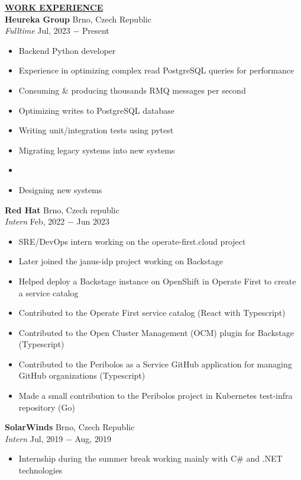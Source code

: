 \documentclass[11pt]{article}
\begin{document}
\noindent \textbf{\underline{WORK EXPERIENCE}} \\
\noindent \textbf{Heureka Group} \hfill Brno, Czech Republic \\
\textit{Fulltime} \hfill Jul, 2023 $-$ Present
\begin{itemize}[noitemsep,nolistsep,leftmargin=*]
\item Backend Python developer
\item Experience in optimizing complex read PostgreSQL queries for performance
\item Consuming \& producing thousands RMQ messages per second
\item Optimizing writes to PostgreSQL database
\item Writing unit/integration tests using pytest
\item Migrating legacy systems into new systems
\item 
\item Designing new systems \\
\end{itemize}

\noindent \textbf{Red Hat} \hfill Brno, Czech republic \\
\textit{Intern} \hfill Feb, 2022 $-$ Jun 2023
\begin{itemize}[noitemsep,nolistsep,leftmargin=*]
\item SRE/DevOps intern working on the operate-first.cloud project
\item Later joined the janus-idp project working on Backstage
\item Helped deploy a Backstage instance on OpenShift in Operate First to create a service catalog 
\item Contributed to the Operate First service catalog (React with Typescript)
\item Contributed to the Open Cluster Management (OCM) plugin for Backstage (Typescript)
\item Contributed to the Peribolos as a Service GitHub application for managing GitHub organizations (Typescript)
\item Made a small contribution to the Peribolos project in Kubernetes test-infra repository (Go) \\
\end{itemize}

\noindent \textbf{SolarWinds} \hfill Brno, Czech Republic \\
\textit{Intern} \hfill Jul, 2019 $-$ Aug, 2019
\begin{itemize}[noitemsep,nolistsep,leftmargin=*]
\item {Internship during the summer break working mainly with C\# and .NET technologies\\}
\end{itemize}
\end{document}
